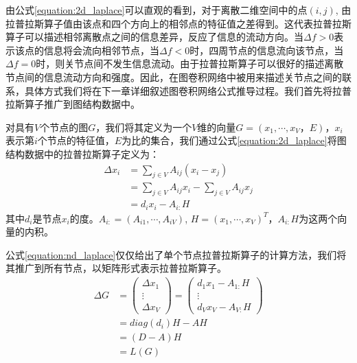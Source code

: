 由公式\ref{equation:2d_laplace}可以直观的看到，对于离散二维空间中的点$(i,j)$, 由拉普拉斯算子值由该点和四个方向上的相邻点的特征值之差得到。这代表拉普拉斯算子可以描述相邻离散点之间的信息差异，反应了信息的流动方向。当$\Delta f > 0$表示该点的信息将会流向相邻节点，当$\Delta f < 0$时，四周节点的信息流向该节点，当$\Delta f = 0$时，则关节点间不发生信息流动。由于拉普拉斯算子可以很好的描述离散节点间的信息流动方向和强度。因此，在图卷积网络中被用来描述关节点之间的联系，具体方式我们将在下一章详细叙述图卷积网络公式推导过程。我们首先将拉普拉斯算子推广到图结构数据中。

对具有$V$个节点的图$G$，我们将其定义为一个$V$维的向量$G=(x_1, \cdots, x_V， E)$，$x_i$表示第$i$个节点的特征值，$E$为比的集合，我们通过公式\ref{equation:2d_laplace}将图结构数据中的拉普拉斯算子定义为：
\begin{equation}
    \begin{aligned}
        \Delta x_i &= \sum_{j \in V}A_{ij}(x_i - x_j) \\
        &=\sum_{j \in V}A_{ij}x_i - \sum_{j \in V}A_{ij}x_j \\
        &= d_i x_i - A_{i:}H
    \end{aligned}
    \label{equation:nd_laplace}
\end{equation}
其中$d_i$是节点$x_i$的度。$A_{i:} = (A_{i1},\cdots, A_{iV})$, $H = (x_1, \cdots, x_V)^T$，$A_{i:}H$为这两个向量的内积。

公式\ref{equation:nd_laplace}仅仅给出了单个节点拉普拉斯算子的计算方法，我们将其推广到所有节点，以矩阵形式表示拉普拉斯算子。
\begin{equation}
    \begin{aligned}
        \Delta G &= \left(  \begin{array}{cccc}
            \Delta x_1 \\
            \vdots \\
            \Delta x_V
         \end{array} \right) = 
         \left(  \begin{array}{cccc}
            d_1x_1 - A_{1:}H \\
            \vdots \\
            d_Vx_V - A_{V:}H
         \end{array} \right)
        \\
        & =diag(d_i)H - AH \\
        & = (D-A)H \\
        & = L(G)
    \end{aligned}
    \label{equation:nd_laplace_mat}
\end{equation}

